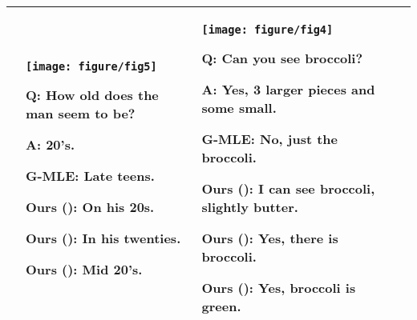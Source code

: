 \documentclass{article}
\begin{document}
\begin{table}[t]
\begin{center}
\begin{tabular}{p{3.0cm} p{3.0cm} p{3.0cm} p{3.0cm} p{2.5cm}}
\begin{minipage}{2.8cm}
\begin{compactenum}[\hspace{-6pt}]
    \end{compactenum}
    \end{minipage}
    &
    \vspace{-10pt}
    \center
    \texttt{[image: figure/fig5]}
    \newline\vspace{-10pt}    
    \begin{minipage}{2.8cm}
    \begin{compactenum}[\hspace{-6pt}]
    \tiny
    \item \tiny \textbf{Q}: How old does the man seem to be?
    \item \tiny \textbf{A}: 20's.
	\item \tiny \textbf{G-MLE}: Late teens.
	\item \tiny \textbf{Ours ()}: On his 20s.
	\item \tiny \textbf{Ours ()}: In his twenties.
	\item \tiny \textbf{Ours ()}: Mid 20's.
    \end{compactenum}
    \end{minipage}
    &
    \vspace{-10pt}
    \center
    \texttt{[image: figure/fig4]}
    \newline\vspace{-10pt}    
    \begin{minipage}{2.8cm}
    \begin{compactenum}[\hspace{-6pt}]
    \tiny
    \item \tiny \textbf{Q}: Can you see broccoli?
    \item \tiny \textbf{A}: Yes, 3 larger pieces and some small.
	\item \tiny \textbf{G-MLE}: No, just the broccoli.
	\item \tiny \textbf{Ours ()}: I can see broccoli, slightly butter.
	\item \tiny \textbf{Ours ()}: Yes, there is broccoli.
	\item \tiny \textbf{Ours ()}: Yes, broccoli is green.
    \end{compactenum}
    \end{minipage}
	\vspace{3mm}
	\tabularnewline
    \bottomrule
    \end{tabular}\\\end{center}
    \vspace{-4mm}
\end{table} 
\end{document}
